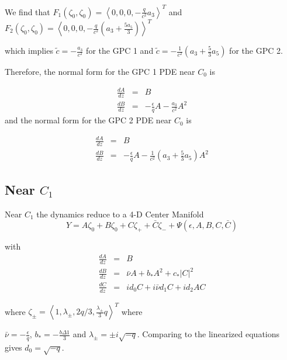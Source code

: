 We find that $F_1(\zeta_0,\zeta_0) = \left<0,0,0,-\frac{q }{c^2} a_3 \right>^T$  and $F_2(\zeta_0,\zeta_0) = \left<0,0,0,-\frac{ q }{c^2}\left( a_3 + \frac{5 a_5}{3}\right) \right>^T$

which implies $\tilde{c} = - \frac{a_3}{c^2} $ for the GPC 1 and $\tilde{c} = -\frac{1}{c^2} \left(a_3 + \frac{5}{3} a_5 \right) $ for the GPC 2.

Therefore, the normal form for the GPC 1 PDE near $C_0$ is

\begin{subequations}
\begin{eqnarray}
\frac{dA}{dz} &=& B \\
\frac{dB}{dz} &=& -\frac{\epsilon}{q} A - \frac{a_3}{c^2}  A^2
\end{eqnarray}
\end{subequations}
 and the normal form for the GPC 2 PDE near $C_0$ is

\begin{subequations}
\begin{eqnarray}
\frac{dA}{dz} &=& B \\
\frac{dB}{dz} &=& -\frac{\epsilon}{q} A -\frac{1}{c^2} \left(a_3 + \frac{5}{3} a_5 \right)  A^2
\end{eqnarray}
\end{subequations}

\subsection{ Near $C_1$ }
Near $C_1$ the dynamics reduce to a 4-D Center Manifold
\begin{equation} Y = A \zeta_0 + B \zeta_0 + C \zeta_+ + \bar{C} \zeta_- + \Psi(\epsilon,A,B,C,\bar{C})
\end{equation}

with 
\begin{subequations}
\begin{eqnarray}
\frac{dA}{dz} &=& B \\ \label{eq:aq}
\frac{dB}{dz} &=& \bar{\nu} A + b_* A^2 + c_* \left|C\right|^2 \\ \label{eq:bq}
\frac{dC}{dz} &=& i d_0 C + i \bar{\nu} d_1 C + i d_2 A C \label{eq:cq}
\end{eqnarray}
\end{subequations}

where  $\zeta_\pm = \left< 1, \lambda_\pm, 2 q / 3, \frac{\lambda_\pm}{3} q\right>^T$ where 

$\bar{\nu} = -\frac{\epsilon}{q}$, $b_* = -\frac{b \Delta1}{3}$  and $\lambda_\pm = \pm i \sqrt{-q} $. Comparing to the linearized equations gives $d_0 = \sqrt{-q} $.

